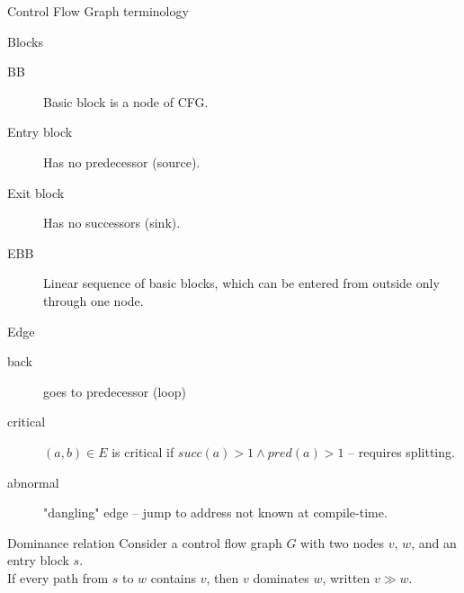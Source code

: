 \documentclass[8pt]{beamer}
\begin{document}
\begin{frame}{Control Flow Graph terminology}
  \begin{block}{Blocks}
    \begin{description}
      \item[BB] Basic block is a node of CFG.
      \item[Entry block] Has no predecessor (source).
      \item[Exit block] Has no successors (sink).
      \item[EBB] Linear sequence of basic blocks, which can be entered from outside only through one node.
    \end{description}
  \end{block}

  \begin{block}{Edge}
    \begin{description}
      \item[back] goes to predecessor (loop)
      \item[critical] $(a,b) \in E$ is critical if $succ(a) > 1 \land pred(a) > 1$ -- requires splitting. 
      \item[abnormal] "dangling" edge -- jump to address not known at compile-time.
    \end{description}
  \end{block}

  \begin{block}{Dominance relation}
    Consider a control flow graph $G$ with two nodes $v$, $w$, and an entry
    block $s$. \\
    If every path from $s$ to $w$ contains $v$, then $v$ dominates $w$, written
    $v \gg w$.
  \end{block}
\end{frame}
\end{document}
